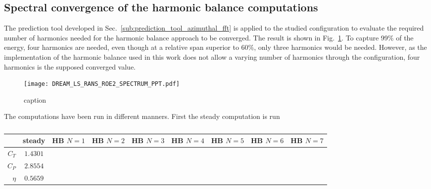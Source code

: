 
\subsection{Spectral convergence of the harmonic balance computations} 
\label{sub:dream_ls_hb_convergence}

The prediction tool developed in 
Sec.~\ref{sub:prediction_tool_azimuthal_fft} is applied
to the studied configuration to evaluate the
required number of harmonics needed for the
harmonic balance approach to be converged.
The result is shown in Fig.~\ref{fig:DREAM_LS_RANS_ROE2_SPECTRUM_PPT}.
To capture 99\% of the energy, four harmonics are needed, even though
at a relative span superior to 60\%, only three harmonics would be needed.
However, as the implementation of the harmonic balance used
in this work does not allow a varying number of harmonics through the
configuration, four harmonics is the supposed converged value.
\begin{figure}[htbp]
  \centering
  \texttt{[image: DREAM\_LS\_RANS\_ROE2\_SPECTRUM\_PPT.pdf]}
  \caption{caption}
  \label{fig:DREAM_LS_RANS_ROE2_SPECTRUM_PPT}
\end{figure}

The computations have been run in different manners. First the steady computation
is run
\begin{table}[htb]
   \centering
  \begin{tabular}{rcccccccc}
    \toprule
    & steady & HB $N=1$ & HB $N=2$ & HB $N=3$ & HB $N=4$ & HB $N=5$ & HB $N=6$ & HB $N=7$\\
    \midrule
    $C_T$  & $1.4301$ &  \\
    $C_P$  & $2.8554$ &  \\
    $\eta$ & $0.5659$ &  \\
    \bottomrule
  \end{tabular}
  \caption{}
  \label{tab:}
\end{table}



